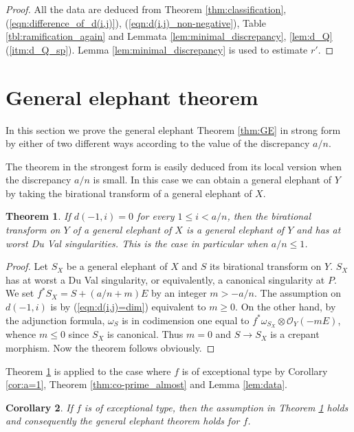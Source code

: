\documentclass[a4paper,11pt]{amsart}
\newtheorem{theorem}{Theorem}[section]
\newtheorem{corollary}[theorem]{Corollary}
\theoremstyle{definition}
\theoremstyle{remark}
\numberwithin{equation}{section}
\newcommand{\cO}{{\mathcal O}}
\begin{document}
\begin{proof}
All the data are deduced from Theorem \ref{thm:classification},
(\ref{eqn:difference_of_d(i,j)}), (\ref{eqn:d(i,j)_non-negative}),
Table \ref{tbl:ramification_again} and
Lemmata  \ref{lem:minimal_discrepancy}, \ref{lem:d_Q}(\ref{itm:d_Q_sp}).
Lemma \ref{lem:minimal_discrepancy} is used to estimate $r'$.
\end{proof}

\section{General elephant theorem}\label{sec:GE}
In this section we prove the general elephant Theorem \ref{thm:GE}
in strong form by either of two different ways
according to the value of the discrepancy $a/n$.

The theorem in the strongest form is easily deduced from its local version
when the discrepancy $a/n$ is small.
In this case we can obtain a general elephant of $Y$ by taking
the birational transform of a general elephant of $X$.

\begin{theorem}\label{thm:easy_GE}
If $d(-1, i)=0$ for every $1 \le i < a/n$,
then the birational transform on $Y$ of a general elephant of $X$
is a general elephant of $Y$ and has at worst Du Val singularities.
This is the case in particular when $a/n\le1$.
\end{theorem}

\begin{proof}
Let $S_X$ be a general elephant of $X$ and
$S$ its birational transform on $Y$.
$S_X$ has at worst a Du Val singularity, or equivalently,
a canonical singularity at $P$.
We set $f^*S_X=S+(a/n+m)E$ by an integer $m>-a/n$.
The assumption on $d(-1, i)$ is by (\ref{eqn:d(i,j)=dim})
equivalent to $m \ge 0$.
On the other hand, by the adjunction formula,
$\omega_S$ is in codimension one equal to $f^*\omega_{S_X} \otimes \cO_Y(-mE)$,
whence $m \le 0$ since $S_X$ is canonical.
Thus $m=0$ and $S \to S_X$ is a crepant morphism.
Now the theorem follows obviously.
\end{proof}

Theorem \ref{thm:easy_GE} is applied to the case where
$f$ is of exceptional type
by Corollary \ref{cor:a=1}, Theorem \ref{thm:co-prime_almost}
and Lemma \ref{lem:data}.

\begin{corollary}\label{cor:easy_GE_exceptional}
If $f$ is of exceptional type,
then the assumption in Theorem \textup{\ref{thm:easy_GE}} holds
and consequently the general elephant theorem holds for $f$.
\end{corollary}
\end{document}
